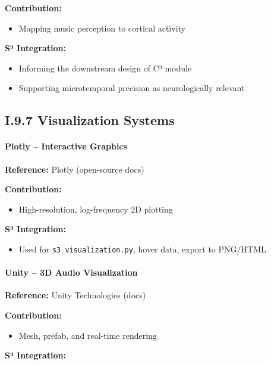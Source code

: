 \textbf{Contribution:}

\begin{itemize}
    \item Mapping music perception to cortical activity
\end{itemize}

\textbf{S³ Integration:}

\begin{itemize}
    \item Informing the downstream design of C³ module
    \item Supporting microtemporal precision as neurologically relevant
\end{itemize}

\subsection*{I.9.7 Visualization Systems}

\paragraph{Plotly – Interactive Graphics}

\textbf{Reference:} Plotly (open-source docs)

\textbf{Contribution:}

\begin{itemize}
    \item High-resolution, log-frequency 2D plotting
\end{itemize}

\textbf{S³ Integration:}

\begin{itemize}
    \item Used for \texttt{s3\_visualization.py}, hover data, export to PNG/HTML
\end{itemize}

\paragraph{Unity – 3D Audio Visualization}

\textbf{Reference:} Unity Technologies (docs)

\textbf{Contribution:}

\begin{itemize}
    \item Mesh, prefab, and real-time rendering
\end{itemize}

\textbf{S³ Integration:}

